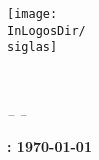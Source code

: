 \pagestyle{empty}

\begin{center}
\texttt{[image: \\InLogosDir/\\siglas]}\\
\end{center}
\vspace{1cm}
\begin{center}
\begin{huge}
\BookTitle\\
\vspace{1cm}
\SchoolFullName
\end{huge}
\end{center}

\vspace{2cm}

\begin{center}
\begin{Large}\textit{-- \Semester --}\end{Large}
\end{center}
\vspace{2cm}

\begin{center}
\begin{Large}\textbf{\city: \today}\end{Large}
\end{center}

